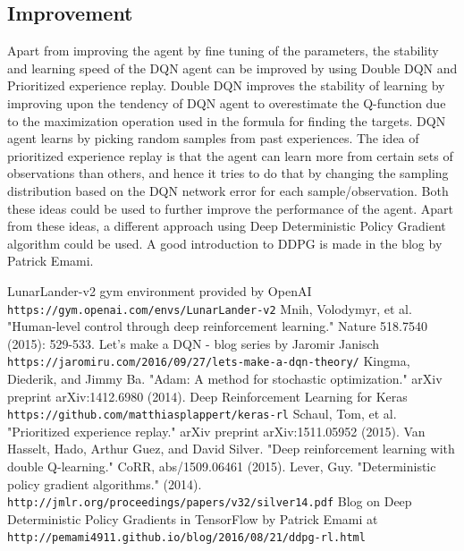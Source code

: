 \documentclass{article}
\begin{document}
\subsection*{Improvement}
Apart from improving the agent by fine tuning of the parameters, the stability and learning speed of the DQN agent can be improved by using Double DQN\cite{doubleq} and Prioritized experience replay\cite{prio}. Double DQN improves the stability of learning by improving upon the tendency of DQN agent to overestimate the Q-function due to the maximization operation used in the formula for finding the targets. DQN agent learns by picking random samples from past experiences. The idea of prioritized experience replay is that the agent can learn more from certain sets of observations than others, and hence it tries to do that by changing the sampling distribution based on the DQN network error for each sample/observation. Both these ideas could be used to further improve the performance of the agent. Apart from these ideas, a different approach using Deep Deterministic Policy Gradient\cite{DDPG} algorithm could be used. A good introduction to DDPG is made in the blog\cite{DDPGblog} by Patrick Emami.
\begin{thebibliography}{}
LunarLander-v2 gym environment provided by OpenAI\\ \texttt{https://gym.openai.com/envs/LunarLander-v2}
Mnih, Volodymyr, et al. "Human-level control through deep reinforcement learning." Nature 518.7540 (2015): 529-533.
Let’s make a DQN - blog series by Jaromir Janisch\\\texttt{https://jaromiru.com/2016/09/27/lets-make-a-dqn-theory/}
Kingma, Diederik, and Jimmy Ba. "Adam: A method for stochastic optimization." arXiv preprint arXiv:1412.6980 (2014).
Deep Reinforcement Learning for Keras\\\texttt{https://github.com/matthiasplappert/keras-rl}
Schaul, Tom, et al. "Prioritized experience replay." arXiv preprint arXiv:1511.05952 (2015).
Van Hasselt, Hado, Arthur Guez, and David Silver. "Deep reinforcement learning with double Q-learning." CoRR, abs/1509.06461 (2015).
Lever, Guy. "Deterministic policy gradient algorithms." (2014).\\\texttt{http://jmlr.org/proceedings/papers/v32/silver14.pdf}
Blog on Deep Deterministic Policy Gradients in TensorFlow by Patrick Emami at\\\texttt{http://pemami4911.github.io/blog/2016/08/21/ddpg-rl.html}
\end{thebibliography}
\end{document}
